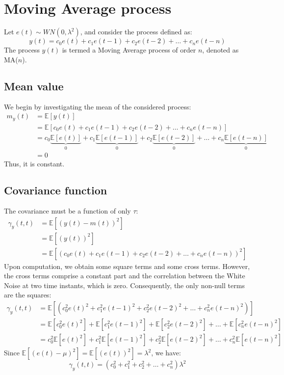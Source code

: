 \section{Moving Average process}

Let $e(t)\sim WN(0,\lambda^2)$, and consider the process defined as:
\[y(t)=c_0e(t)+c_1e(t-1)+c_2e(t-2)+\dots+c_n e(t-n)\]
The process $y(t)$ is termed a Moving Average process of order $n$, denoted as MA($n$).

\subsection{Mean value}
We begin by investigating the mean of the considered process:
\begin{align*}
    m_y(t)  &=\mathbb{E}\left[y(t)\right] \\
            &=\mathbb{E}\left[c_0e(t)+c_1e(t-1)+c_2e(t-2)+\dots+c_n e(t-n)\right] \\
            &=c_0\underbrace{\mathbb{E}\left[e(t)\right]}_0  + c_1\underbrace{\mathbb{E}\left[e(t-1)\right]}_0  + c_2\underbrace{\mathbb{E}\left[e(t-2)\right]}_0  + \dots + c_n\underbrace{\mathbb{E}\left[e(t-n)\right]}_0 \\
            &=0
\end{align*}
Thus, it is constant.

\subsection{Covariance function}
The covariance must be a function of only $\tau$: 
\begin{align*}
    \gamma_y(t,t)   &=\mathbb{E}\left[{\left(y(t)-m(t)\right)}^2\right] \\
                    &=\mathbb{E}\left[{\left(y(t)\right)}^2\right] \\
                    &=\mathbb{E}\left[{\left(c_0e(t)+c_1e(t-1)+c_2e(t-2)+\dots+c_n e(t-n)\right)}^2\right] 
\end{align*}
Upon computation, we obtain some square terms and some cross terms. 
However, the cross terms comprise a constant part and the correlation between the  White Noise at two time instants, which is zero. 
Consequently, the only non-null terms are the squares:
\begin{align*}
    \gamma_y(t,t)   &=\mathbb{E}\left[\left(c_0^2{e(t)}^2+c_1^2{e(t-1)}^2+c_2^2{e(t-2)}^2+\dots+c_n^2{e(t-n)}^2\right)\right] \\
                    &=\mathbb{E}\left[c_0^2{e(t)}^2\right]+\mathbb{E}\left[c_1^2{e(t-1)}^2\right]+\mathbb{E}\left[c_2^2{e(t-2)}^2\right]+\dots+\mathbb{E}\left[c_n^2{e(t-n)}^2\right] \\
                    &=c_0^2\mathbb{E}\left[{e(t)}^2\right]+c_1^2\mathbb{E}\left[{e(t-1)}^2\right]+c_2^2\mathbb{E}\left[{e(t-2)}^2\right]+\dots+c_n^2\mathbb{E}\left[{e(t-n)}^2\right]
\end{align*}
Since $\mathbb{E}\left[{\left(e(t)-\mu\right)}^2\right]=\mathbb{E}\left[{\left(e(t)\right)}^2\right]=\lambda^2$, we have:
\[\gamma_y(t,t)=\left(c_0^2+c_1^2+c_2^2+\dots+c_n^2\right)\lambda^2\]

